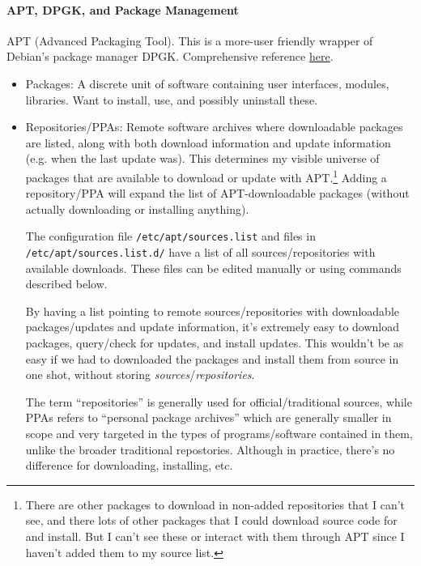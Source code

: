 \documentclass[12pt]{article}
\theoremstyle{plain}
\theoremstyle{definition}
\theoremstyle{remark}
\begin{document}
\paragraph{APT, DPGK, and Package Management}
APT (Advanced Packaging Tool).
This is a more-user friendly wrapper of Debian's package manager DPGK.
Comprehensive reference
\href{https://www.digitalocean.com/community/tutorials/ubuntu-and-debian-package-management-essentials}{here}.
\begin{itemize}
  \item Packages: A discrete unit of software containing user
    interfaces, modules, libraries.
    Want to install, use, and possibly uninstall these.

  \item Repositories/PPAs:
    Remote software archives where downloadable packages are listed,
    along with both download information and update information (e.g.
    when the last update was).
    This determines my visible universe of packages that are available
    to download or update with APT.\footnote{%
      There are other packages to download in non-added repositories
      that I can't see, and there lots of other packages that I could
      download source code for and install. But I can't see these or
      interact with them through APT since I haven't added them to my
      source list.
    }
    Adding a repository/PPA will expand the list of APT-downloadable
    packages (without actually downloading or installing anything).

    The configuration file \texttt{/etc/apt/sources.list}
    and files in \texttt{/etc/apt/sources.list.d/}
    have a list of all sources/repositories with available downloads.
    These files can be edited manually or using commands described
    below.

    By having a list pointing to remote sources/repositories with
    downloadable packages/updates and update information,
    it's extremely easy to download packages, query/check for updates,
    and install updates.
    This wouldn't be as easy if we had to downloaded the packages and
    install them from source in one shot, without storing
    \emph{sources}/\emph{repositories}.

    The term ``repositories'' is generally used for official/traditional
    sources, while PPAs refers to ``personal package archives'' which
    are generally smaller in scope and very targeted in the types of
    programs/software contained in them, unlike the broader traditional
    repostories.
    Although in practice, there's no difference for downloading,
    installing, etc.


\end{itemize}
\end{document}
